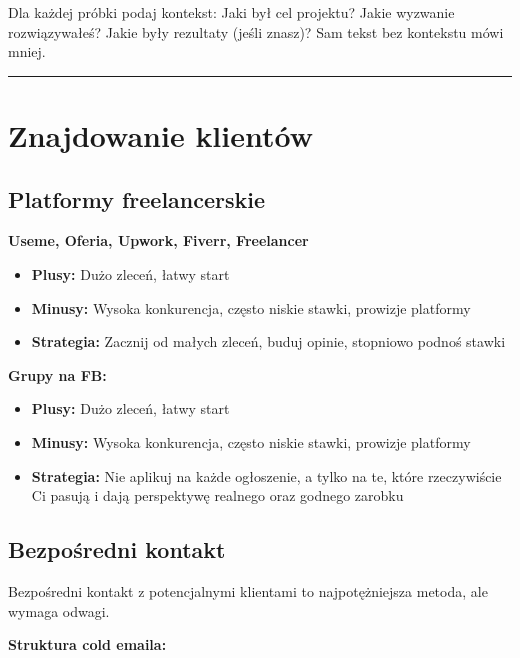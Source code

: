 \documentclass[
  12pt,
  a4paper,
  twoside,
  openright,
  12pt,
  DIV=12,
  BCOR=12mm]{scrbook}
\providecommand{\tightlist}{%
  \setlength{\itemsep}{0pt}\setlength{\parskip}{0pt}}\usepackage{longtable,booktabs,array}
\newcommand{\decoline}{%
  \begin{center}
    \textcolor{bordergray}{\rule{0.3\textwidth}{0.5pt}}
  \end{center}
}
\begin{document}
\begin{wazne}
Dla każdej próbki podaj kontekst: Jaki był cel projektu? Jakie wyzwanie rozwiązywałeś? Jakie były rezultaty (jeśli znasz)? Sam tekst bez kontekstu mówi mniej.
\end{wazne}

\decoline

\section{Znajdowanie klientów}\label{znajdowanie-klientuxf3w}

\subsection{Platformy freelancerskie}\label{platformy-freelancerskie}

\textbf{Useme, Oferia, Upwork, Fiverr, Freelancer}

\begin{itemize}
\tightlist
\item
  \textbf{Plusy:} Dużo zleceń, łatwy start
\item
  \textbf{Minusy:} Wysoka konkurencja, często niskie stawki, prowizje
  platformy
\item
  \textbf{Strategia:} Zacznij od małych zleceń, buduj opinie, stopniowo
  podnoś stawki
\end{itemize}

\textbf{Grupy na FB:}

\begin{itemize}
\tightlist
\item
  \textbf{Plusy:} Dużo zleceń, łatwy start
\item
  \textbf{Minusy:} Wysoka konkurencja, często niskie stawki, prowizje
  platformy
\item
  \textbf{Strategia:} Nie aplikuj na każde ogłoszenie, a tylko na te,
  które rzeczywiście Ci pasują i dają perspektywę realnego oraz godnego
  zarobku
\end{itemize}

\subsection{Bezpośredni kontakt}\label{bezpoux15bredni-kontakt}

Bezpośredni kontakt z potencjalnymi klientami to najpotężniejsza metoda,
ale wymaga odwagi.

\textbf{Struktura cold emaila:}
\end{document}
